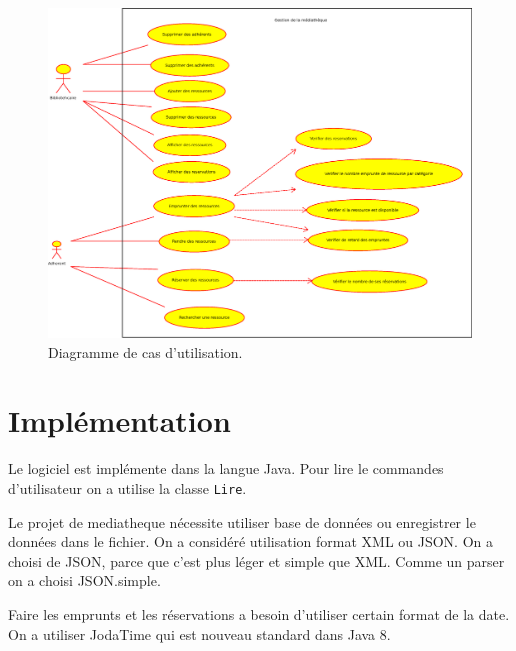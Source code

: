 \documentclass[10pt, a4paper]{article}
\begin{document}
    		 \begin{figure}[h]
			\begin{center}
				\includegraphics[width=1\textwidth]{graphics/usecasediagram.eps}
				\caption{Diagramme de cas d'utilisation.}
			\end{center}
		\end{figure}
	
	\section{Implémentation}
	Le logiciel est implémente dans la langue Java. Pour lire le commandes d'utilisateur on a utilise 
	la classe \texttt{Lire}.
	
	Le projet de mediatheque nécessite utiliser base de données ou enregistrer le données dans le fichier.
	On a considéré utilisation format XML ou JSON. On a choisi de JSON, parce que c'est plus léger et 
	simple que XML. Comme un parser on a choisi JSON.simple.
	
	Faire les emprunts et les réservations a besoin d'utiliser certain format de la date. On a utiliser 
	JodaTime qui est nouveau standard dans Java 8.
	
\end{document}
